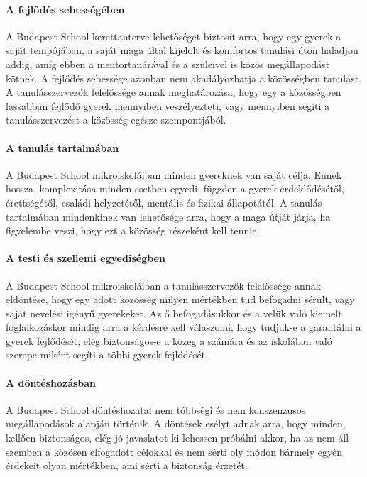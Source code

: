 \paragraph{A fejlődés sebességében}

  A Budapest School kerettanterve lehetőséget biztosít arra, hogy egy
  gyerek a saját tempójában, a saját maga által kijelölt és komfortos
  tanulási úton haladjon addig, amíg ebben a mentortanárával és a
  szüleivel is közös megállapodást kötnek. A fejlődés sebessége azonban
  nem akadályozhatja a közösségben tanulást. A tanulásszervezők
  felelőssége annak meghatározása, hogy egy a közösségben lassabban
  fejlődő gyerek mennyiben veszélyezteti, vagy mennyiben segíti a
  tanulásszervezést a közösség egésze szempontjából.


\paragraph{A tanulás tartalmában}


  A Budapest School mikroiskoláiban minden gyereknek van saját célja.
  Ennek hossza, komplexitása minden esetben egyedi, függően a gyerek
  érdeklődésétől, érettségétől, családi helyzetétől, mentális és fizikai
  állapotától. A tanulás tartalmában mindenkinek van lehetősége arra,
  hogy a maga útját járja, ha figyelembe veszi, hogy ezt a közösség
  részeként kell tennie.


\paragraph{A testi és szellemi egyediségben}

  A Budapest School mikroiskoláiban a tanulásszervezők felelőssége annak
  eldöntése, hogy egy adott közösség milyen mértékben tud befogadni
  sérült, vagy saját nevelési igényű gyerekeket. Az ő befogadásukkor és
  a velük való kiemelt foglalkozáskor mindig arra a kérdésre kell
  válaszolni, hogy tudjuk-e a garantálni a gyerek fejlődését, elég
  biztonságos-e a közeg a számára és az iskolában való szerepe miként
  segíti a többi gyerek fejlődését.


\paragraph{A döntéshozásban}

  A Budapest School döntéshozatal nem többségi és nem konszenzusos
  megállapodások alapján történik. A döntések esélyt adnak arra, hogy
  minden, kellően biztonságos, elég jó javaslatot ki lehessen próbálni
  akkor, ha az nem áll szemben a közösen elfogadott célokkal és nem
  sérti oly módon bármely egyén érdekeit olyan mértékben, ami sérti a
  biztonság érzetét.

